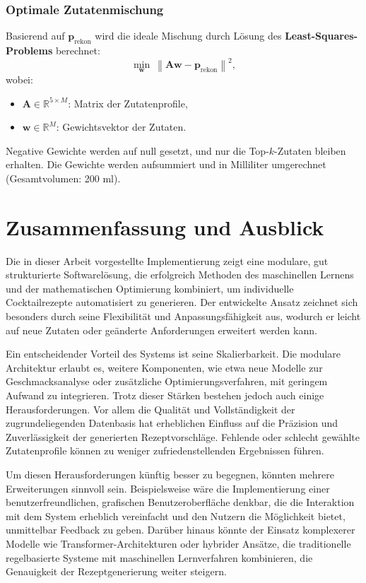 \documentclass[12pt, a4paper]{report}
\begin{document}
\subsection*{Optimale Zutatenmischung}
Basierend auf \( \mathbf{p}_{\text{rekon}} \) wird die ideale Mischung durch Lösung des \textbf{Least-Squares-Problems} berechnet:
\[
  \min_{\mathbf{w}} \ \left\lVert \mathbf{A} \mathbf{w} - \mathbf{p}_{\text{rekon}} \right\rVert^2,
\]
wobei:
\begin{itemize}
  \item \( \mathbf{A} \in \mathbb{R}^{5 \times M} \): Matrix der Zutatenprofile,
  \item \( \mathbf{w} \in \mathbb{R}^M \): Gewichtsvektor der Zutaten.
\end{itemize}
Negative Gewichte werden auf null gesetzt, und nur die Top-\( k \)-Zutaten bleiben erhalten. Die Gewichte werden aufsummiert und in Milliliter umgerechnet (Gesamtvolumen: 200 ml).


\chapter{Zusammenfassung und Ausblick}
Die in dieser Arbeit vorgestellte Implementierung zeigt eine modulare, gut strukturierte Softwarelösung, die erfolgreich Methoden des maschinellen Lernens und der mathematischen Optimierung kombiniert, um individuelle Cocktailrezepte automatisiert zu generieren. Der entwickelte Ansatz zeichnet sich besonders durch seine Flexibilität und Anpassungsfähigkeit aus, wodurch er leicht auf neue Zutaten oder geänderte Anforderungen erweitert werden kann.

Ein entscheidender Vorteil des Systems ist seine Skalierbarkeit. Die modulare Architektur erlaubt es, weitere Komponenten, wie etwa neue Modelle zur Geschmacksanalyse oder zusätzliche Optimierungsverfahren, mit geringem Aufwand zu integrieren. Trotz dieser Stärken bestehen jedoch auch einige Herausforderungen. Vor allem die Qualität und Vollständigkeit der zugrundeliegenden Datenbasis hat erheblichen Einfluss auf die Präzision und Zuverlässigkeit der generierten Rezeptvorschläge. Fehlende oder schlecht gewählte Zutatenprofile können zu weniger zufriedenstellenden Ergebnissen führen.

Um diesen Herausforderungen künftig besser zu begegnen, könnten mehrere Erweiterungen sinnvoll sein. Beispielsweise wäre die Implementierung einer benutzerfreundlichen, grafischen Benutzeroberfläche denkbar, die die Interaktion mit dem System erheblich vereinfacht und den Nutzern die Möglichkeit bietet, unmittelbar Feedback zu geben. Darüber hinaus könnte der Einsatz komplexerer Modelle wie Transformer-Architekturen oder hybrider Ansätze, die traditionelle regelbasierte Systeme mit maschinellen Lernverfahren kombinieren, die Genauigkeit der Rezeptgenerierung weiter steigern.
\end{document}
